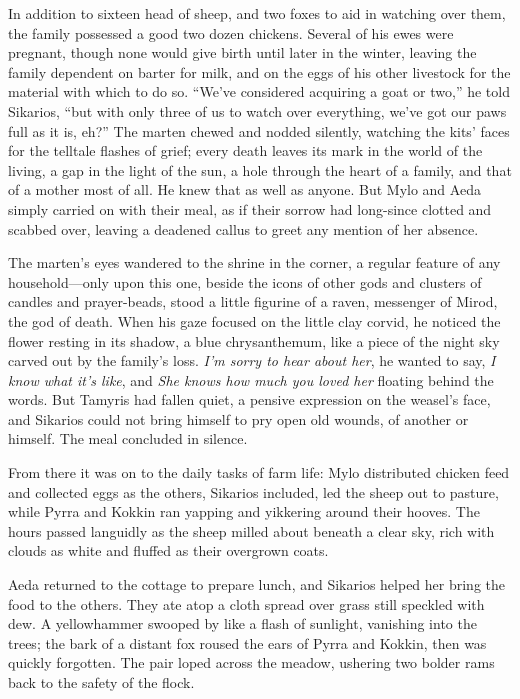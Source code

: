 In addition to sixteen head of sheep, and two foxes to aid in watching over them, the family possessed a good two dozen chickens. Several of his ewes were pregnant, though none would give birth until later in the winter, leaving the family dependent on barter for milk, and on the eggs of his other livestock for the material with which to do so. ``We've considered acquiring a goat or two,'' he told Sikarios, ``but with only three of us to watch over everything, we've got our paws full as it is, eh?'' The marten chewed and nodded silently, watching the kits' faces for the telltale flashes of grief; every death leaves its mark in the world of the living, a gap in the light of the sun, a hole through the heart of a family, and that of a mother most of all. He knew that as well as anyone. But Mylo and Aeda simply carried on with their meal, as if their sorrow had long-since clotted and scabbed over, leaving a deadened callus to greet any mention of her absence.

The marten's eyes wandered to the shrine in the corner, a regular feature of any household---only upon this one, beside the icons of other gods and clusters of candles and prayer-beads, stood a little figurine of a raven, messenger of Mirod, the god of death. When his gaze focused on the little clay corvid, he noticed the flower resting in its shadow, a blue chrysanthemum, like a piece of the night sky carved out by the family's loss. \emph{I'm sorry to hear about her}, he wanted to say, \emph{I know what it's like}, and \emph{She knows how much you loved her} floating behind the words. But Tamyris had fallen quiet, a pensive expression on the weasel's face, and Sikarios could not bring himself to pry open old wounds, of another or himself. The meal concluded in silence.

From there it was on to the daily tasks of farm life: Mylo distributed chicken feed and collected eggs as the others, Sikarios included, led the sheep out to pasture, while Pyrra and Kokkin ran yapping and yikkering around their hooves. The hours passed languidly as the sheep milled about beneath a clear sky, rich with clouds as white and fluffed as their overgrown coats.

Aeda returned to the cottage to prepare lunch, and Sikarios helped her bring the food to the others. They ate atop a cloth spread over grass still speckled with dew. A yellowhammer swooped by like a flash of sunlight, vanishing into the trees; the bark of a distant fox roused the ears of Pyrra and Kokkin, then was quickly forgotten. The pair loped across the meadow, ushering two bolder rams back to the safety of the flock.

